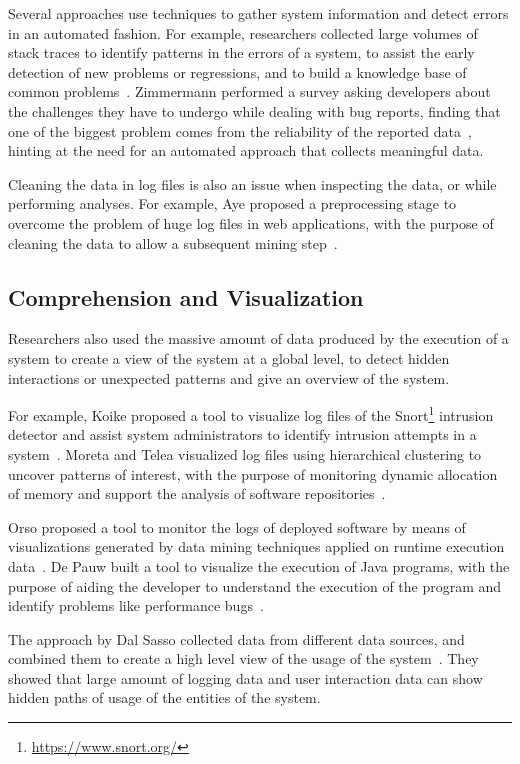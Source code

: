 Several approaches use techniques to gather system information and detect errors in an automated fashion.
For example, researchers collected large volumes of stack traces to identify patterns in the errors of a system, to assist the early detection of new problems or regressions, and to build a knowledge base of common problems~\cite{Han2012,Arno2007,DalS2015b}.
Zimmermann \etal performed a survey asking developers about the challenges they have to undergo while dealing with bug reports, finding that one of the biggest problem comes from the reliability of the reported data~\cite{Zimm2010a}, hinting at the need for an automated approach that collects meaningful data.

Cleaning the data in log files is also an issue when inspecting the data, or while performing analyses.
For example, Aye proposed a preprocessing stage to overcome the problem of huge log files in web applications, with the purpose of cleaning the data to allow a subsequent mining step~\cite{Aye2011}.

\subsection{Comprehension and Visualization}

Researchers also used the massive amount of data produced by the execution of a system to create a view of the system at a global level, to detect hidden interactions or unexpected patterns and give an overview of the system.

For example, Koike proposed a tool to visualize log files of the Snort\footnote{\url{https://www.snort.org/}} intrusion detector and assist system administrators to identify intrusion attempts in a system~\cite{Koik2004}.
Moreta and Telea visualized log files using hierarchical clustering to uncover patterns of interest, with the purpose of monitoring dynamic allocation of memory and support the analysis of software repositories~\cite{More2007}.

Orso \etal proposed a tool to monitor the logs of deployed software by means of visualizations generated by data mining techniques applied on runtime execution data~\cite{Orso2003}.
De Pauw \etal built a tool to visualize the execution of Java programs, with the purpose of aiding the developer to understand the execution of the program and identify problems like performance bugs~\cite{De2002}.

The approach by Dal Sasso \etal collected data from different data sources, and combined them to create a high level view of the usage of the system~\cite{DalS2015b}.
They showed that large amount of logging data and user interaction data can show hidden paths of usage of the entities of the system.

